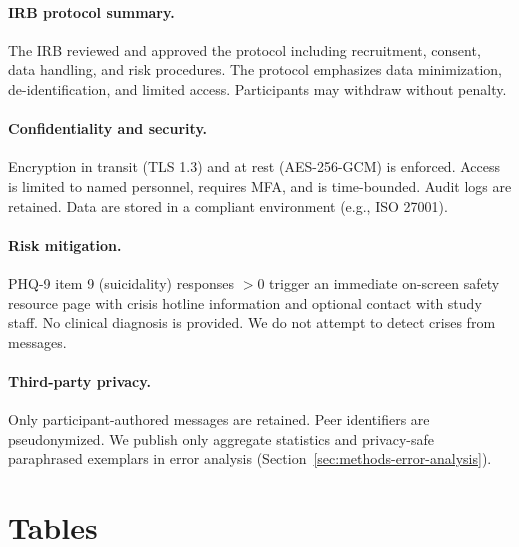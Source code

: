 \paragraph{IRB protocol summary.} The IRB reviewed and approved the protocol including recruitment, consent, data handling, and risk procedures. The protocol emphasizes data minimization, de-identification, and limited access. Participants may withdraw without penalty.

\paragraph{Confidentiality and security.} Encryption in transit (TLS 1.3) and at rest (AES-256-GCM) is enforced. Access is limited to named personnel, requires MFA, and is time-bounded. Audit logs are retained. Data are stored in a compliant environment (e.g., ISO 27001).

\paragraph{Risk mitigation.} PHQ-9 item 9 (suicidality) responses \(>0\) trigger an immediate on-screen safety resource page with crisis hotline information and optional contact with study staff. No clinical diagnosis is provided. We do not attempt to detect crises from messages.

\paragraph{Third-party privacy.} Only participant-authored messages are retained. Peer identifiers are pseudonymized. We publish only aggregate statistics and privacy-safe paraphrased exemplars in error analysis (Section~\ref{sec:methods-error-analysis}).

\section{Tables}



